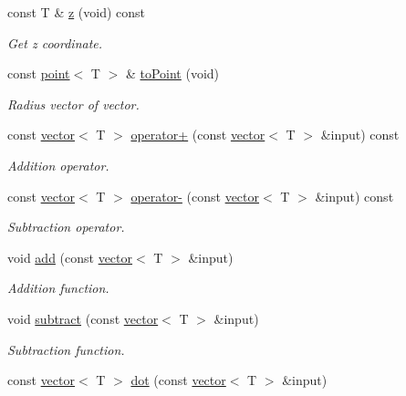 \begin{DoxyCompactItemize}
const T \& \hyperlink{classddd_1_1vector_a6f9a297e7ba387597ca0515421012166}{z} (void) const
\begin{DoxyCompactList}\small\item\em Get z coordinate. \end{DoxyCompactList}\item 
\mbox{\label{classddd_1_1vector_a5fe880482ce10fe9af876458d79f153e}} 
const \hyperlink{classddd_1_1point}{point}$<$ T $>$ \& \hyperlink{classddd_1_1vector_a5fe880482ce10fe9af876458d79f153e}{to\+Point} (void)
\begin{DoxyCompactList}\small\item\em Radius vector of vector. \end{DoxyCompactList}\item 
const \hyperlink{classddd_1_1vector}{vector}$<$ T $>$ \hyperlink{classddd_1_1vector_a1d49d5831ff14a0845a0ce3ac0f4e02d}{operator+} (const \hyperlink{classddd_1_1vector}{vector}$<$ T $>$ \&input) const
\begin{DoxyCompactList}\small\item\em Addition operator. \end{DoxyCompactList}\item 
const \hyperlink{classddd_1_1vector}{vector}$<$ T $>$ \hyperlink{classddd_1_1vector_a6d3a62dbfdd3747aa5f640f18aef9220}{operator-\/} (const \hyperlink{classddd_1_1vector}{vector}$<$ T $>$ \&input) const
\begin{DoxyCompactList}\small\item\em Subtraction operator. \end{DoxyCompactList}\item 
void \hyperlink{classddd_1_1vector_a97eca6a6625002022ab2442b5cbd0462}{add} (const \hyperlink{classddd_1_1vector}{vector}$<$ T $>$ \&input)
\begin{DoxyCompactList}\small\item\em Addition function. \end{DoxyCompactList}\item 
void \hyperlink{classddd_1_1vector_abf367c7da55ad2c770a90a3ed3c01d5a}{subtract} (const \hyperlink{classddd_1_1vector}{vector}$<$ T $>$ \&input)
\begin{DoxyCompactList}\small\item\em Subtraction function. \end{DoxyCompactList}\item 
const \hyperlink{classddd_1_1vector}{vector}$<$ T $>$ \hyperlink{classddd_1_1vector_a61e3ccdb85f4d41c142c80b429808baf}{dot} (const \hyperlink{classddd_1_1vector}{vector}$<$ T $>$ \&input)

\end{DoxyCompactItemize}
